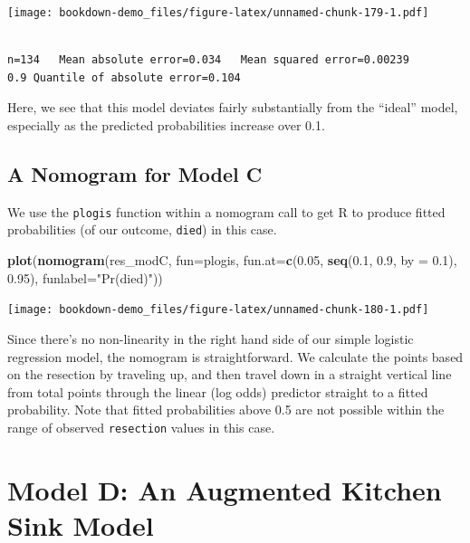 \documentclass[]{book}
\newenvironment{Shaded}{\begin{snugshade}}{\end{snugshade}}
\newcommand{\KeywordTok}[1]{\textcolor[rgb]{0.13,0.29,0.53}{\textbf{#1}}}
\newcommand{\DataTypeTok}[1]{\textcolor[rgb]{0.13,0.29,0.53}{#1}}
\newcommand{\FloatTok}[1]{\textcolor[rgb]{0.00,0.00,0.81}{#1}}
\newcommand{\StringTok}[1]{\textcolor[rgb]{0.31,0.60,0.02}{#1}}
\newcommand{\NormalTok}[1]{#1}
\theoremstyle{definition}
\theoremstyle{definition}
\theoremstyle{definition}
\theoremstyle{remark}
\begin{document}
\texttt{[image: bookdown-demo\_files/figure-latex/unnamed-chunk-179-1.pdf]}

\begin{verbatim}

n=134   Mean absolute error=0.034   Mean squared error=0.00239
0.9 Quantile of absolute error=0.104
\end{verbatim}

Here, we see that this model deviates fairly substantially from the
``ideal'' model, especially as the predicted probabilities increase over
0.1.

\subsection{A Nomogram for Model C}\label{a-nomogram-for-model-c}

We use the \texttt{plogis} function within a nomogram call to get R to
produce fitted probabilities (of our outcome, \texttt{died}) in this
case.

\begin{Shaded}
\begin{Highlighting}[]
\KeywordTok{plot}\NormalTok{(}\KeywordTok{nomogram}\NormalTok{(res_modC, }\DataTypeTok{fun=}\NormalTok{plogis, }
              \DataTypeTok{fun.at=}\KeywordTok{c}\NormalTok{(}\FloatTok{0.05}\NormalTok{, }\KeywordTok{seq}\NormalTok{(}\FloatTok{0.1}\NormalTok{, }\FloatTok{0.9}\NormalTok{, }\DataTypeTok{by =} \FloatTok{0.1}\NormalTok{), }\FloatTok{0.95}\NormalTok{), }
              \DataTypeTok{funlabel=}\StringTok{"Pr(died)"}\NormalTok{))}
\end{Highlighting}
\end{Shaded}

\texttt{[image: bookdown-demo\_files/figure-latex/unnamed-chunk-180-1.pdf]}

Since there's no non-linearity in the right hand side of our simple
logistic regression model, the nomogram is straightforward. We calculate
the points based on the resection by traveling up, and then travel down
in a straight vertical line from total points through the linear (log
odds) predictor straight to a fitted probability. Note that fitted
probabilities above 0.5 are not possible within the range of observed
\texttt{resection} values in this case.

\section{Model D: An Augmented Kitchen Sink
Model}\label{model-d-an-augmented-kitchen-sink-model}
\end{document}
